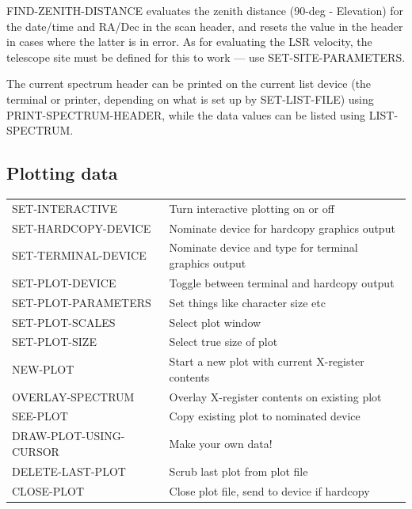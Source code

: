 \documentclass[11pt,twoside]{report}
\begin{document}
FIND-ZENITH-DISTANCE evaluates the zenith distance
(90-deg - Elevation) for the date/time and RA/Dec in the scan header, and
resets the value in the header in cases where the latter is in error. As for
evaluating the LSR velocity, the telescope
site must be defined for this to
work --- use SET-SITE-PARAMETERS.

The current spectrum header can be printed on the current list device
(the terminal or printer, depending on what is set up by SET-LIST-FILE)
using PRINT-SPECTRUM-HEADER, while the data values can be listed
using LIST-SPECTRUM.

\subsection{Plotting data}

\begin{tabular}{ll}
SET-INTERACTIVE        & Turn interactive plotting on or off\\
SET-HARDCOPY-DEVICE    & Nominate device for hardcopy graphics output\\
SET-TERMINAL-DEVICE    & Nominate device and type for terminal graphics output\\
SET-PLOT-DEVICE        & Toggle between terminal and hardcopy output\\
SET-PLOT-PARAMETERS    & Set things like character size etc\\
SET-PLOT-SCALES        & Select plot window\\
SET-PLOT-SIZE          & Select true size of plot\\
NEW-PLOT               & Start a new plot with current X-register contents\\
OVERLAY-SPECTRUM       & Overlay X-register contents on existing plot\\
SEE-PLOT               & Copy existing plot to nominated device\\
DRAW-PLOT-USING-CURSOR & Make your own data!\\
DELETE-LAST-PLOT       & Scrub last plot from plot file\\
CLOSE-PLOT             & Close plot file, send to device if hardcopy\\
\end{tabular}
\end{document}
